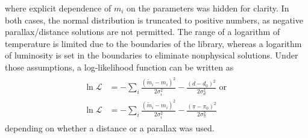 \documentclass{pracalicmgr}
\begin{document}
where explicit dependence of $m_i$ on the parameters was hidden for clarity. In both cases, the normal distribution is truncated to positive numbers, as
negative parallax/distance solutions are not permitted. The range of a logarithm of temperature is limited due to the boundaries of the library, whereas a logarithm of luminosity is
set in the boundaries to eliminate nonphysical solutions.
Under those assumptions, a log-likelihood function can be written as 
\begin{align}
    \begin{split}
    \ln{\mathcal{L}} &= -\sum_i\frac{(\tilde{m}_i-m_i)^2}{2\sigma_i^2}-\frac{(d-d_0)^2}{2\sigma_d^2} \textrm{ or }\\
    \ln{\mathcal{L}} &= -\sum_i\frac{(\tilde{m}_i-m_i)^2}{2\sigma_i^2}-\frac{(\pi-\pi_0)^2}{2\sigma_{\pi}^2}
    \end{split}
\end{align} depending on whether a distance or a parallax was used. 
\end{document}
